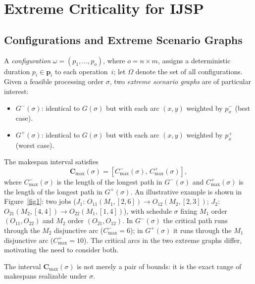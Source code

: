 \documentclass[preprint,12pt]{elsarticle}
\begin{document}
\section{Extreme Criticality for IJSP}
\label{sec:criticality}

\subsection{Configurations and Extreme Scenario Graphs}
\label{sec:configurations}

A \emph{configuration} $\omega = (p_1,\ldots,p_o)$, where $o = n \times m$, assigns a deterministic duration $p_i \in \mathbf{p}_i$ to each operation~$i$; let $\Omega$ denote the set of all configurations. Given a feasible processing order $\sigma$, two \emph{extreme scenario graphs} are of particular interest:
\begin{itemize}
\item $G^-(\sigma)$: identical to $G(\sigma)$ but with each arc $(x,y)$ weighted by $p_{x}^{-}$ (best case).
\item $G^+(\sigma)$: identical to $G(\sigma)$ but with each arc $(x,y)$ weighted by $p_{x}^{+}$ (worst case).
\end{itemize}
The makespan interval satisfies
\begin{equation}
\mathbf{C}_{\max}(\sigma) = [C^-_{\max}(\sigma),\, C^+_{\max}(\sigma)],
\end{equation}
where $C^-_{\max}(\sigma)$ is the length of the longest path in $G^-(\sigma)$ and $C^+_{\max}(\sigma)$ is the length of the longest path in $G^+(\sigma)$. An illustrative example is shown in Figure~\ref{fig1}: two jobs ($J_1$: $O_{11}(M_1,[2,6])\!\to\!O_{12}(M_2,[2,3])$; $J_2$: $O_{21}(M_2,[4,4])\!\to\!O_{22}(M_1,[1,4])$), with schedule $\sigma$ fixing $M_1$ order $(O_{11},O_{22})$ and $M_2$ order $(O_{21},O_{12})$. In $G^-(\sigma)$ the critical path runs through the $M_2$ disjunctive arc ($C^-_{\max}=6$); in $G^+(\sigma)$ it runs through the $M_1$ disjunctive arc ($C^+_{\max}=10$). The critical arcs in the two extreme graphs differ, motivating the need to consider both.

The interval $\mathbf{C}_{\max}(\sigma)$ is not merely a pair of bounds: it is the exact range of makespans realizable under $\sigma$.
\end{document}
